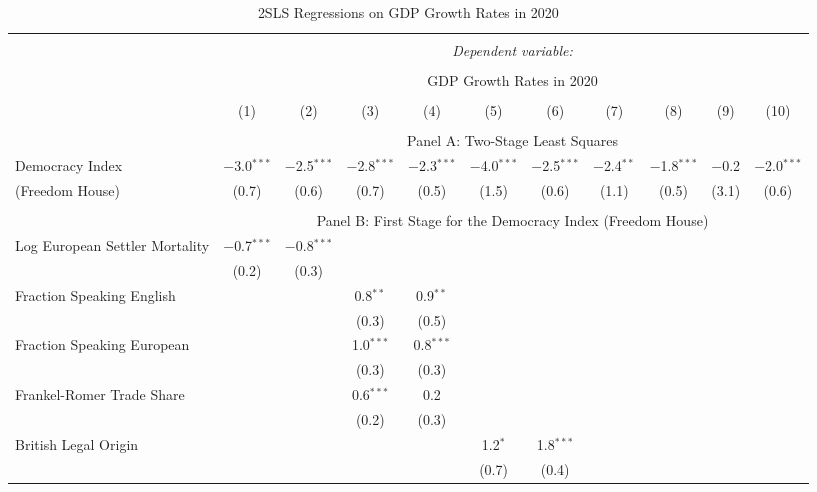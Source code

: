 
\begin{table}[!htbp] 
  \caption{2SLS Regressions on GDP Growth Rates in 2020}
  \label{tab:2sls-gdp-gdp-weighting} 
  \footnotesize
  \begin{threeparttable}
\begin{tabular}{@{\extracolsep{0pt}}lcccccccccc} 
\\[-1.8ex]\hline 
\hline \\[-1.8ex] 
 & \multicolumn{10}{c}{\textit{Dependent variable:}} \\ 
\cline{2-11} 
\\[-1.8ex] & \multicolumn{10}{c}{GDP Growth Rates in 2020} \\ 
\\[-1.8ex] & (1) & (2) & (3) & (4) & (5) & (6) & (7) & (8) & (9) & (10)\\ 
\hline \\[-1.8ex] 
  & \multicolumn{10}{c}{Panel A: Two-Stage Least Squares} \\
   Democracy Index & $-$3.0$^{***}$ & $-$2.5$^{***}$ & $-$2.8$^{***}$ & $-$2.3$^{***}$ & $-$4.0$^{***}$ & $-$2.5$^{***}$ & $-$2.4$^{**}$ & $-$1.8$^{***}$ & $-$0.2 & $-$2.0$^{***}$ \\ 
  (Freedom House) & (0.7) & (0.6) & (0.7) & (0.5) & (1.5) & (0.6) & (1.1) & (0.5) & (3.1) & (0.6) \\ 
 \hline \\[-1.8ex] 
   & \multicolumn{10}{c}{Panel B: First Stage for the Democracy Index (Freedom House)} \\
  Log European Settler Mortality & $-$0.7$^{***}$ & $-$0.8$^{***}$ &  &  &  &  &  &  &  &  \\ 
  & (0.2) & (0.3) &  &  &  &  &  &  &  &  \\ 
  Fraction Speaking English &  &  & 0.8$^{**}$ & 0.9$^{**}$ &  &  &  &  &  &  \\ 
  &  &  & (0.3) & (0.5) &  &  &  &  &  &  \\ 
  Fraction Speaking European &  &  & 1.0$^{***}$ & 0.8$^{***}$ &  &  &  &  &  &  \\ 
  &  &  & (0.3) & (0.3) &  &  &  &  &  &  \\ 
  Frankel-Romer Trade Share &  &  & 0.6$^{***}$ & 0.2 &  &  &  &  &  &  \\ 
  &  &  & (0.2) & (0.3) &  &  &  &  &  &  \\ 
  British Legal Origin &  &  &  &  & 1.2$^{*}$ & 1.8$^{***}$ &  &  &  &  \\ 
  &  &  &  &  & (0.7) & (0.4) &  &  &  &  \\ 

\end{tabular}
\end{threeparttable}
\end{table}
